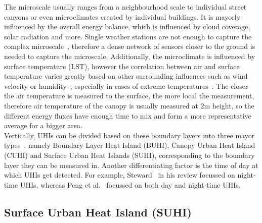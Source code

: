 The microscale usually ranges from a neighbourhood scale to individual street canyons or even microclimates created by individual buildings. It is mayorly influenced by the overall energy balance, which is influenced by cloud coverage, solar radiation and more. Single weather stations are not enough to capture the complex microscale~\cite{oke2004siting}, therefore a dense network of sensors closer to the ground is needed to capture the microscale. Additionally, the microclimate is influenced by surface temperature (LST), however the correlation between air and surface temperature varies greatly based on other surrounding influences such as wind velocity or humidity~\cite{stoll1992surface}, especially in cases of extreme temperatures~\cite{good2016situ}. The closer the air temperature is measured to the surface, the more local the measurement, therefore air temperature of the canopy is usually measured at 2m height, so the different energy fluxes have enough time to mix and form a more representative average for a bigger area.\\
Vertically, UHIs can be divided based on these boundary layers into three mayor types~\cite{oke1976distinction, oke2017urban}, namely Boundary Layer Heat Island (BUHI), Canopy Urban Heat Island (CUHI) and Surface Urban Heat Islands (SUHI), corresponding to the boundary layer they can be measured in. Another differentiating factor is the time of day at which UHIs get detected. For example, Steward~\cite{stewart2011systematic} in his review focussed on night-time UHIs, whereas Peng et al.~\cite{peng2012surface} focussed on both day and night-time UHIs.

\subsection{Surface Urban Heat Island (SUHI)}

